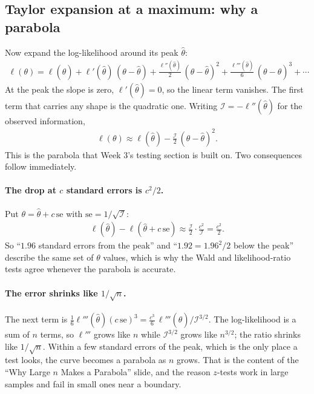\documentclass[11pt]{article}
\theoremstyle{definition}
\newcommand{\loglik}{\ell}
\newcommand{\Info}{\mathcal{I}}
\begin{document}
\subsection{Taylor expansion at a maximum: why a parabola}
\label{sec:taylor-max}

Now expand the log-likelihood around its peak $\hat\theta$:
\begin{align*}
  \loglik(\theta) = \loglik(\hat\theta) + \loglik'(\hat\theta)\,(\theta-\hat\theta)
  + \frac{\loglik''(\hat\theta)}{2}\,(\theta-\hat\theta)^2
  + \frac{\loglik'''(\hat\theta)}{6}\,(\theta-\hat\theta)^3 + \cdots
\end{align*}
At the peak the slope is zero, $\loglik'(\hat\theta) = 0$, so the linear
term vanishes. The first term that carries any shape is the quadratic one.
Writing $\Info = -\loglik''(\hat\theta)$ for the observed information,
\begin{align*}
  \loglik(\theta) \approx \loglik(\hat\theta) - \frac{\Info}{2}\,(\theta-\hat\theta)^2 .
\end{align*}
This is the parabola that Week 3's testing section is built on. Two
consequences follow immediately.

\paragraph{The drop at $c$ standard errors is $c^2/2$.} Put
$\theta = \hat\theta + c\,\mathrm{se}$ with $\mathrm{se} = 1/\sqrt{\Info}$:
\begin{align*}
  \loglik(\hat\theta) - \loglik(\hat\theta + c\,\mathrm{se})
  \approx \frac{\Info}{2}\cdot\frac{c^2}{\Info} = \frac{c^2}{2}.
\end{align*}
So ``$1.96$ standard errors from the peak'' and ``$1.92 = 1.96^2/2$ below
the peak'' describe the same set of $\theta$ values, which is why the Wald
and likelihood-ratio tests agree whenever the parabola is accurate.

\paragraph{The error shrinks like $1/\sqrt n$.} The next term is
$\frac{1}{6}\loglik'''(\hat\theta)(c\,\mathrm{se})^3 =
\frac{c^3}{6}\,\loglik'''(\hat\theta)/\Info^{3/2}$. The log-likelihood is a
sum of $n$ terms, so $\loglik'''$ grows like $n$ while $\Info^{3/2}$ grows
like $n^{3/2}$; the ratio shrinks like $1/\sqrt n$. Within a few standard
errors of the peak, which is the only place a test looks, the curve becomes
a parabola as $n$ grows. That is the content of the ``Why Large $n$ Makes a
Parabola'' slide, and the reason $z$-tests work in large samples and fail in
small ones near a boundary.
\end{document}
